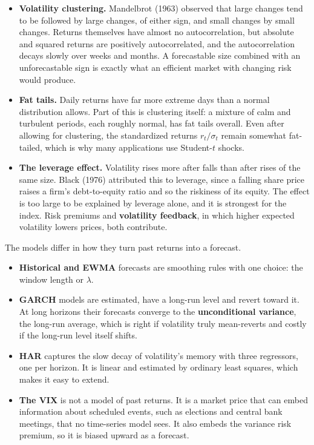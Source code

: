 \begin{itemize}
  \item \textbf{Volatility clustering.} Mandelbrot (1963) observed that large changes tend to be followed by large changes, of either sign, and small changes by small changes. Returns themselves have almost no autocorrelation, but absolute and squared returns are positively autocorrelated, and the autocorrelation decays slowly over weeks and months. A forecastable size combined with an unforecastable sign is exactly what an efficient market with changing risk would produce.
  \item \textbf{Fat tails.} Daily returns have far more extreme days than a normal distribution allows. Part of this is clustering itself: a mixture of calm and turbulent periods, each roughly normal, has fat tails overall. Even after allowing for clustering, the standardized returns $r_t / \sigma_t$ remain somewhat fat-tailed, which is why many applications use Student-$t$ shocks.
  \item \textbf{The leverage effect.} Volatility rises more after falls than after rises of the same size. Black (1976) attributed this to leverage, since a falling share price raises a firm's debt-to-equity ratio and so the riskiness of its equity. The effect is too large to be explained by leverage alone, and it is strongest for the index. Risk premiums and \textbf{volatility feedback}, in which higher expected volatility lowers prices, both contribute.
\end{itemize}

The models differ in how they turn past returns into a forecast.

\begin{itemize}
  \item \textbf{Historical and EWMA} forecasts are smoothing rules with one choice: the window length or $\lambda$.
  \item \textbf{GARCH} models are estimated, have a long-run level and revert toward it. At long horizons their forecasts converge to the \textbf{unconditional variance}, the long-run average, which is right if volatility truly mean-reverts and costly if the long-run level itself shifts.
  \item \textbf{HAR} captures the slow decay of volatility's memory with three regressors, one per horizon. It is linear and estimated by ordinary least squares, which makes it easy to extend.
  \item \textbf{The VIX} is not a model of past returns. It is a market price that can embed information about scheduled events, such as elections and central bank meetings, that no time-series model sees. It also embeds the variance risk premium, so it is biased upward as a forecast.
\end{itemize}

